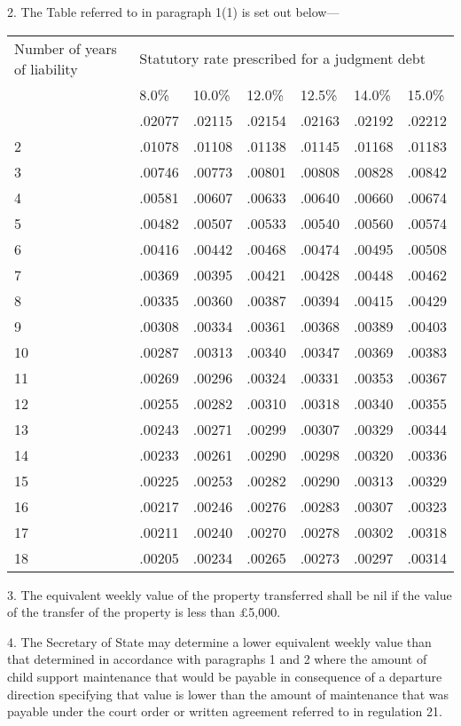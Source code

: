 \documentclass[a4paper]{article}
\begin{document}
\medskip

2.  The Table referred to in paragraph 1(1) is set out below—

\noindent
\begin{longtable}{p{96.00522pt} lll lll}
\hline
Number of years of liability&\multicolumn{6}{l}{Statutory rate prescribed for a judgment debt}\\
& 8.0\%&10.0\%&12.0\%&12.5\%&14.0\%&15.0\%\\
\hline
\endhead
\hline
\endlastfoot
1&.02077&.02115&.02154&.02163&.02192&.02212\\
2&.01078&.01108&.01138&.01145&.01168&.01183\\
3&.00746&.00773&.00801&.00808&.00828&.00842\\
4&.00581&.00607&.00633&.00640&.00660&.00674\\
5&.00482&.00507&.00533&.00540&.00560&.00574\\
6&.00416&.00442&.00468&.00474&.00495&.00508\\
7&.00369&.00395&.00421&.00428&.00448&.00462\\
8&.00335&.00360&.00387&.00394&.00415&.00429\\
9&.00308&.00334&.00361&.00368&.00389&.00403\\
10&.00287&.00313&.00340&.00347&.00369&.00383\\
11&.00269&.00296&.00324&.00331&.00353&.00367\\
12&.00255&.00282&.00310&.00318&.00340&.00355\\
13&.00243&.00271&.00299&.00307&.00329&.00344\\
14&.00233&.00261&.00290&.00298&.00320&.00336\\
15&.00225&.00253&.00282&.00290&.00313&.00329\\
16&.00217&.00246&.00276&.00283&.00307&.00323\\
17&.00211&.00240&.00270&.00278&.00302&.00318\\
18&.00205&.00234&.00265&.00273&.00297&.00314\\ 
\end{longtable}

\medskip

3. The equivalent weekly value of the property transferred shall be nil if the value of the transfer of the property is less than £5,000.

\medskip

4.  The Secretary of State may determine a lower equivalent weekly value than that determined in accordance with paragraphs 1 and 2 where the amount of child support maintenance that would be payable in consequence of a departure direction specifying that value is lower than the amount of maintenance that was payable under the court order or written agreement referred to in regulation 21.
\end{document}

